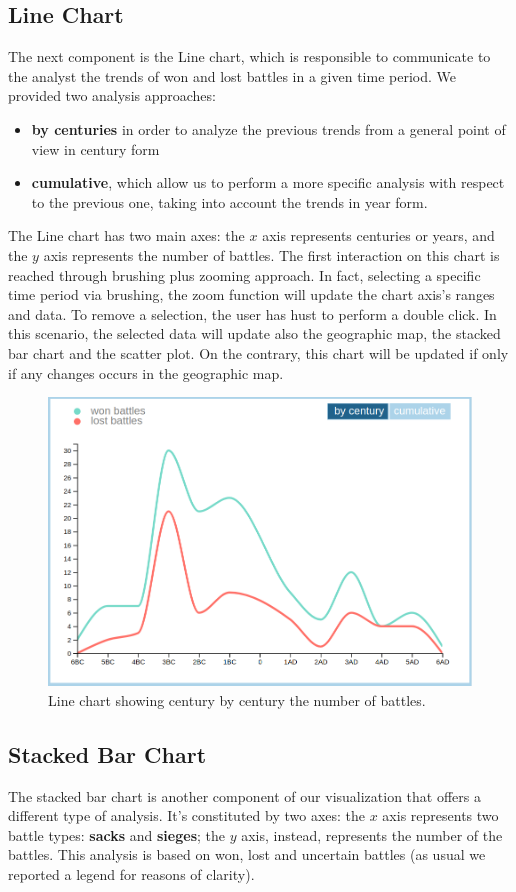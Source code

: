 \subsection{Line Chart}
The next component is the Line chart, which is responsible to communicate to the analyst the trends of won and lost battles in a given time period. We provided two analysis approaches:
\begin{itemize}
    \item \textbf{by centuries} in order to analyze the previous trends from a general point of view in century form
    \item \textbf{cumulative}, which allow us to perform a more specific analysis with respect to the previous one, taking into account the trends in year form.
\end{itemize}
The Line chart has two main axes: the $x$ axis represents centuries or years, and the $y$ axis represents the number of battles. The first interaction on this chart is reached through brushing plus zooming approach. In fact, selecting a specific time period via brushing, the zoom function will update the chart axis's ranges and data. To remove a selection, the user has hust to perform a double click. In this scenario, the selected data will update also the geographic map, the stacked bar chart and the scatter plot. On the contrary, this chart will be updated if only if any changes occurs in the geographic map.
\begin{figure}[h]
\centering
\includegraphics[scale=0.20]{./images/line_chart.png}
\caption{Line chart showing century by century the number of battles.}
\end{figure}

\subsection{Stacked Bar Chart}
The stacked bar chart is another component of our visualization that offers a different type of analysis. It's constituted by two axes: the $x$ axis represents two battle types: \textbf{sacks} and \textbf{sieges}; the $y$ axis, instead, represents the number of the battles. This analysis is based on won, lost and uncertain battles (as usual we reported a legend for reasons of clarity).

